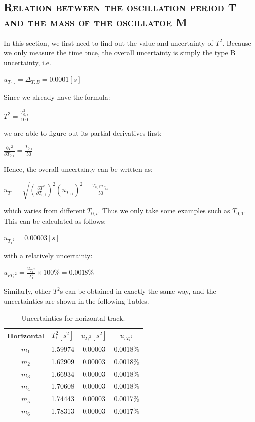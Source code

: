 \documentclass[a4paper,12pt]{article}
\begin{document}
\begin{appendices}
\subsection{\textsc{Relation between the oscillation period T and the mass of the oscillator M}}
In this section, we first need to find out the value and uncertainty of $T^2$. Because we only measure the time once, the overall uncertainty is simply the type B uncertainty, i.e.
\begin{center}
$ u_{T_{0,i}} = \Delta_{T,B} = 0.0001[s] $
\end{center}
Since we already have the formula:
\begin{center}
$\displaystyle T^2 = \frac{T_{0,i}^2}{100} $
\end{center}
we are able to figure out its partial derivatives first:
\begin{center}
$ \displaystyle \frac{\partial T^2}{\partial T_{0,i}} = \frac{T_{0,i}}{50}$
\end{center}
Hence, the overall uncertainty can be written as:
\begin{center}
$\displaystyle u_{T^2} = \sqrt{(\frac{\partial T^2}{\partial T_{0,i}})^2(u_{T_{0,i}})^2} = \frac{T_{0,i}u_{T_{0,i}}}{50}$
\end{center}
which varies from different $T_{0,i}$. Thus we only take some examples such as $T_{0,1}$. This can be calculated as follows:
\begin{center}
$ u_{{T_1}^2} = 0.00003 [s] $
\end{center}
with a relatively uncertainty:
\begin{center}
$\displaystyle u_{r{T_1}^2} = \frac{u_{{T_1}^2}}{T_1^2} \times 100 \% = 0.0018 \% $
\end{center}
\par Similarly, other $T^2$s can be obtained in exactly the same way, and the uncertainties are shown in the following Tables.

\begin{table}[h]
\begin{center}
\begin{tabular}{|c|c|c|c|}
\hline
Horizontal & $T_i^2 [s^2] $ & $u_{{T_i}^2} [s^2] $ & $ u_{r{T_i}^2} $\\
\hline
$m_1$ & 1.59974 & 0.00003 & 0.0018\%  \\
$m_2$ & 1.62909 & 0.00003 & 0.0018\%  \\
$m_3$ & 1.66934 & 0.00003 & 0.0018\%  \\
$m_4$ & 1.70608 & 0.00003 & 0.0018\%  \\
$m_5$ & 1.74443 & 0.00003 & 0.0017\%  \\
$m_6$ & 1.78313 & 0.00003 & 0.0017\%  \\
\hline
\end{tabular}
\end{center}
\caption{Uncertainties for horizontal track.}
\end{table}


\end{appendices}
\end{document}

